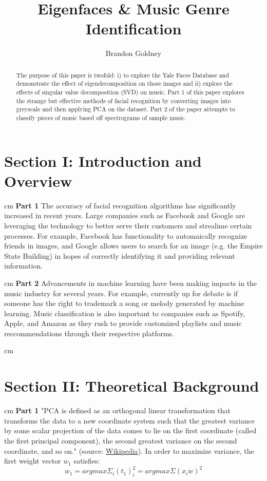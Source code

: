 \documentclass{cup-pan}
\title{Eigenfaces \& Music Genre Identification}
\author[1]{\normalsize Brandon Goldney}
\affil[1]{Department of Applied Mathematics, University of Washington, Email: \url{Goldney@uw.edu}}
\begin{document}
\maketitle

\begin{abstract}
	The purpose of this paper is twofold: i) to explore the Yale Faces Database and demonstrate the effect of eigendecomposition on those images and ii) explore the effects of singular value decomposition (SVD) on music.  Part 1 of this paper explores the strange but effective methods of facial recognition by converting images into greyscale and then applying PCA on the dataset.  Part 2 of the paper attempts to classify pieces of music based off spectrograms of sample music.  
\end{abstract}

\section{Section I: Introduction and Overview}
 cm
\noindent
\textbf{Part 1}
The accuracy of facial recognition algorithms has significantly increased in recent years.  Large companies such as Facebook and Google are leveraging the technology to better serve their customers and strealime certain processes.  For example, Facebook has functionality to automaically recognize friends in images, and Google allows users to search for an image (e.g. the Empire State Building) in hopes of correctly identifying it and providing relevant information.  

 cm
\noindent
\textbf{Part 2}
Advancements in machine learning have been making impacts in the music industry for several years.  For example, currently up for debate is if someone has the right to trademark a song or melody generated by machine learning.  Music classification is also important to companies such as Spotify, Apple, and Amazon as they rush to provide customized playlists and music reccommendations through their respective platforms.

 cm
\section{Section II: Theoretical Background}

 cm
\noindent
\textbf{Part 1}
\nonindent
"PCA is defined as an orthogonal linear transformation that transforms the data to a new coordinate system such that the greatest variance by some scalar projection of the data comes to lie on the first coordinate (called the first principal component), the second greatest variance on the second coordinate, and so on." (source: \href{https://en.wikipedia.org/wiki/Principal\_component\_analysis}{Wikipedia}).  In order to maximize variance, the first weight vector $w_1$ satisfies:
$$
w_1 = arg max{\Sigma_i (t_1)^2_i} = arg max {\Sigma(x_i \dot w)^2}
$$
\end{document}
